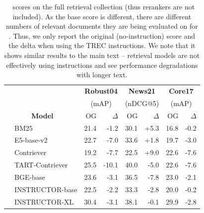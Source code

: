 \setlength\tabcolsep{5 pt} %
\begin{table}[t!]
\small	
\centering
\begin{tabular}{ll|rr|rr|rr}
\toprule
 &  & \multicolumn{2}{c}{\textbf{Robust04}} & \multicolumn{2}{c}{\textbf{News21}} & \multicolumn{2}{c}{\textbf{Core17}} \\ 
 & & \multicolumn{2}{c}{(mAP)} & \multicolumn{2}{c}{(nDCG@5)} & \multicolumn{2}{c}{(mAP)} \\
\multicolumn{2}{c}{\textbf{Model}} &  OG & $\Delta$ & OG & $\Delta$ & OG & $\Delta$ \\
\midrule
\parbox[t]{3mm}{}
& BM25 & 21.4 & -1.2 & 30.1 & +5.3 & 16.8 &  -0.2 \\
& E5-base-v2 & 22.7 & -7.0 & 33.6 & +1.8 & 19.7  & -3.0 \\
& Contriever & 19.2 & -7.7 & 22.5 & +9.0 & 22.6 & -7.6 \\
\midrule
\parbox[t]{3mm}{} 
& TART-Contriever & 25.5 & -10.1 & 40.0 & -5.0 & 22.6 & -7.6 \\
& BGE-base & 23.6 & -3.1 & 36.5 & -7.8 & 23.0 & -2.1 \\
& INSTRUCTOR-base & 22.5  & -2.2 & 33.3 & -2.8 & 20.0 & -0.2 \\
& INSTRUCTOR-XL & 30.4 & -3.1 & 38.1 & -0.1 & 29.9 & -2.8 \\

\bottomrule
\end{tabular}
\caption{\dataset\ scores on the full retrieval collection (thus rerankers are not included). As the base score is different, there are different numbers of relevant documents they are being evaluated on for \metricrank. Thus, we only report the original (no-instruction) score and the delta when using the TREC instructions. We note that it shows similar results to the main text -- retrieval models are not effectively using instructions and see performance degradations with longer text.}
\label{tab:full_collection}
\end{table}